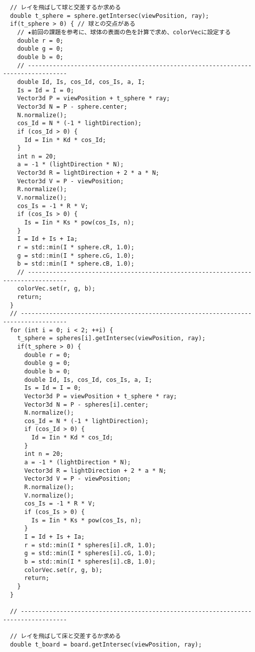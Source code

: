 \documentclass{scrartcl}
\begin{document}
\begin{verbatim}
  // レイを飛ばして球と交差するか求める
  double t_sphere = sphere.getIntersec(viewPosition, ray);
  if(t_sphere > 0) { // 球との交点がある
    // ★前回の課題を参考に、球体の表面の色を計算で求め、colorVecに設定する
    double r = 0;
    double g = 0;
    double b = 0;
    // ---------------------------------------------------------------------------------
    double Id, Is, cos_Id, cos_Is, a, I;
    Is = Id = I = 0;
    Vector3d P = viewPosition + t_sphere * ray;
    Vector3d N = P - sphere.center;
    N.normalize();
    cos_Id = N * (-1 * lightDirection);
    if (cos_Id > 0) {
      Id = Iin * Kd * cos_Id;
    }
    int n = 20;
    a = -1 * (lightDirection * N);
    Vector3d R = lightDirection + 2 * a * N;
    Vector3d V = P - viewPosition;
    R.normalize();
    V.normalize();
    cos_Is = -1 * R * V;
    if (cos_Is > 0) {
      Is = Iin * Ks * pow(cos_Is, n);
    }
    I = Id + Is + Ia;
    r = std::min(I * sphere.cR, 1.0);
    g = std::min(I * sphere.cG, 1.0);
    b = std::min(I * sphere.cB, 1.0);
    // ---------------------------------------------------------------------------------
    colorVec.set(r, g, b);
    return;
  }
  // -----------------------------------------------------------------------------------
  for (int i = 0; i < 2; ++i) {
    t_sphere = spheres[i].getIntersec(viewPosition, ray);
    if(t_sphere > 0) {
      double r = 0;
      double g = 0;
      double b = 0;
      double Id, Is, cos_Id, cos_Is, a, I;
      Is = Id = I = 0;
      Vector3d P = viewPosition + t_sphere * ray;
      Vector3d N = P - spheres[i].center;
      N.normalize();
      cos_Id = N * (-1 * lightDirection);
      if (cos_Id > 0) {
        Id = Iin * Kd * cos_Id;
      }
      int n = 20;
      a = -1 * (lightDirection * N);
      Vector3d R = lightDirection + 2 * a * N;
      Vector3d V = P - viewPosition;
      R.normalize();
      V.normalize();
      cos_Is = -1 * R * V;
      if (cos_Is > 0) {
        Is = Iin * Ks * pow(cos_Is, n);
      }
      I = Id + Is + Ia;
      r = std::min(I * spheres[i].cR, 1.0);
      g = std::min(I * spheres[i].cG, 1.0);
      b = std::min(I * spheres[i].cB, 1.0);
      colorVec.set(r, g, b);
      return;
    }
  }

  // -----------------------------------------------------------------------------------

  // レイを飛ばして床と交差するか求める
  double t_board = board.getIntersec(viewPosition, ray);


\end{verbatim}
\end{document}
